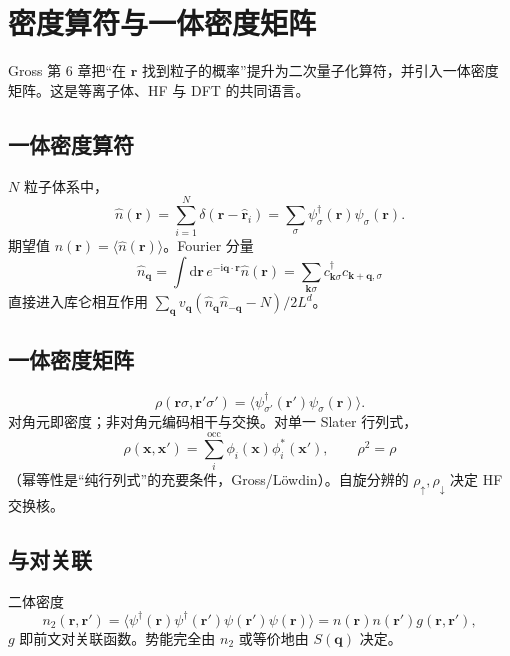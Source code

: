 \section{密度算符与一体密度矩阵}

Gross 第 6 章把“在 $\mathbf{r}$ 找到粒子的概率”提升为二次量子化算符，并引入一体密度矩阵。这是等离子体、HF 与 DFT 的共同语言。

\subsection{一体密度算符}

$N$ 粒子体系中，
\begin{equation}
  \hat n(\mathbf{r})
  =\sum_{i=1}^N \delta(\mathbf{r}-\hat{\mathbf{r}}_i)
  =\sum_\sigma\psi_\sigma^\dagger(\mathbf{r})\psi_\sigma(\mathbf{r}).
\end{equation}
期望值 $n(\mathbf{r})=\langle\hat n(\mathbf{r})\rangle$。Fourier 分量
\begin{equation}
  \hat n_{\mathbf{q}}
  =\int\mathrm{d}\mathbf{r}\,e^{-\mathrm{i}\mathbf{q}\cdot\mathbf{r}}\hat n(\mathbf{r})
  =\sum_{\mathbf{k}\sigma}
  c_{\mathbf{k}\sigma}^\dagger c_{\mathbf{k}+\mathbf{q},\sigma}
\end{equation}
直接进入库仑相互作用 $\sum_{\mathbf{q}}v_{\mathbf{q}}(\hat n_{\mathbf{q}}\hat n_{-\mathbf{q}}-N)/2L^d$。

\subsection{一体密度矩阵}

\begin{equation}
  \rho(\mathbf{r}\sigma,\mathbf{r}'\sigma')
  =\bigl\langle
  \psi_{\sigma'}^\dagger(\mathbf{r}')\psi_\sigma(\mathbf{r})
  \bigr\rangle.
\end{equation}
对角元即密度；非对角元编码相干与交换。对单一 Slater 行列式，
\begin{equation}
  \rho(\mathbf{x},\mathbf{x}')
  =\sum_i^{\mathrm{occ}}
  \phi_i(\mathbf{x})\phi_i^*(\mathbf{x}'),
  \qquad
  \rho^2=\rho
\end{equation}
（幂等性是“纯行列式”的充要条件，Gross/L\"owdin）。自旋分辨的 $\rho_{\uparrow},\rho_{\downarrow}$ 决定 HF 交换核。

\subsection{与对关联}

二体密度
\begin{equation}
  n_2(\mathbf{r},\mathbf{r}')
  =\bigl\langle
  \psi^\dagger(\mathbf{r})\psi^\dagger(\mathbf{r}')\psi(\mathbf{r}')\psi(\mathbf{r})
  \bigr\rangle
  =n(\mathbf{r})n(\mathbf{r}')g(\mathbf{r},\mathbf{r}'),
\end{equation}
$g$ 即前文对关联函数。势能完全由 $n_2$ 或等价地由 $S(\mathbf{q})$ 决定。
